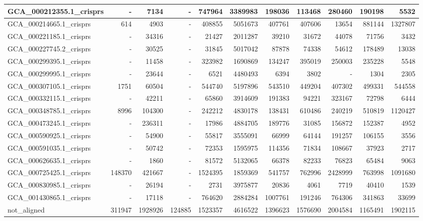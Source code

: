 \documentclass[12pt,a4paper]{article}
\begin{document}
\begin{table}[ht]
\begin{center}
\begin{tabular}{|l*{10}{|r}|}
GCA\_000212355.1\_crisprs & - & 7134 & - & 747964 & 3389983 & 198036 & 113468 & 280460 & 190198 & 5532 \\ \hline
GCA\_000214665.1\_crisprs & 614 & 4903 & - & 408855 & 5051673 & 407761 & 407606 & 13654 & 881144 & 1327807 \\ \hline
GCA\_000221185.1\_crisprs & - & 34316 & - & 21427 & 2011287 & 39210 & 31672 & 44078 & 71756 & 3432 \\ \hline
GCA\_000227745.2\_crisprs & - & 30525 & - & 31845 & 5017042 & 87878 & 74338 & 54612 & 178489 & 13038 \\ \hline
GCA\_000299395.1\_crisprs & - & 11458 & - & 323982 & 1690869 & 134247 & 395019 & 250003 & 235228 & 5548 \\ \hline
GCA\_000299995.1\_crisprs & - & 23644 & - & 6521 & 4480493 & 6394 & 3802 & - & 1304 & 2305 \\ \hline
GCA\_000307105.1\_crisprs & 1751 & 60504 & - & 544740 & 5197896 & 543510 & 449204 & 407302 & 499331 & 544558 \\ \hline
GCA\_000332115.1\_crisprs & - & 42211 & - & 65860 & 3914609 & 191383 & 94221 & 323167 & 72798 & 6444 \\ \hline
GCA\_000348785.1\_crisprs & 8996 & 104300 & - & 242212 & 4830178 & 138431 & 610486 & 240219 & 510819 & 1120427 \\ \hline
GCA\_000473245.1\_crisprs & - & 236311 & - & 17986 & 4884705 & 189776 & 31085 & 156872 & 152387 & 4952 \\ \hline
GCA\_000590925.1\_crisprs & - & 54900 & - & 55817 & 3555091 & 66999 & 64144 & 191257 & 106155 & 3556 \\ \hline
GCA\_000591035.1\_crisprs & - & 50742 & - & 72353 & 1595975 & 114356 & 71834 & 108667 & 37923 & 2717 \\ \hline
GCA\_000626635.1\_crisprs & - & 1860 & - & 81572 & 5132065 & 66378 & 82233 & 76823 & 65484 & 9063 \\ \hline
GCA\_000725425.1\_crisprs & 148370 & 421667 & - & 1524395 & 1859369 & 541757 & 762996 & 2428999 & 763998 & 1091680 \\ \hline
GCA\_000830985.1\_crisprs & - & 26194 & - & 2731 & 3975877 & 20836 & 4061 & 7719 & 40410 & 1539 \\ \hline
GCA\_001430865.1\_crisprs & - & 17118 & - & 764620 & 2884284 & 1007761 & 191246 & 764306 & 341863 & 33699 \\ \hline
not\_aligned & 311947 & 1928926 & 124885 & 1523357 & 4616522 & 1396623 & 1576690 & 2004584 & 1165491 & 1902115 \\ \hline
\end{tabular}
\end{center}
\end{table}
\end{document}
